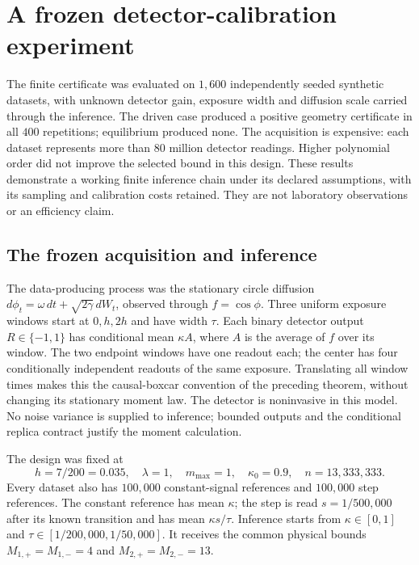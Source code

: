 \chapter{A frozen detector-calibration experiment}
\label{ch:dc-experiment}

The finite certificate was evaluated on $1{,}600$ independently seeded
synthetic datasets, with unknown detector gain, exposure width and diffusion
scale carried through the inference.  The driven case produced a positive
geometry certificate in all $400$ repetitions; equilibrium produced none.
The acquisition is expensive: each dataset represents more than $80$ million
detector readings.  Higher polynomial order did not improve the selected
bound in this design.  These results demonstrate a working finite inference
chain under its declared assumptions, with its sampling and calibration
costs retained.  They are not laboratory observations or an efficiency claim.

\section{The frozen acquisition and inference}

The data-producing process was the stationary circle diffusion
$d\phi_t=\omega\,dt+\sqrt{2\gamma}\,dW_t$, observed through
$f=\cos\phi$.  Three uniform exposure windows start at $0,h,2h$ and have
width $\tau$.  Each binary detector output $R\in\{-1,1\}$ has conditional
mean $\kappa A$, where $A$ is the average of $f$ over its window.  The two
endpoint windows have one readout each; the center has four conditionally
independent readouts of the same exposure.  Translating all window times
makes this the causal-boxcar convention of the preceding theorem, without
changing its stationary moment law.
The detector is noninvasive in this model.  No noise variance is supplied
to inference; bounded outputs and the conditional replica contract justify
the moment calculation.

The design was fixed at
\[
 h=7/200=0.035,\quad \lambda=1,\quad m_{\max}=1,
 \quad\kappa_0=0.9,\quad n=13{,}333{,}333.
\]
Every dataset also has $100{,}000$ constant-signal references and $100{,}000$
step references.  The constant reference has mean $\kappa$; the step is read
$s=1/500{,}000$ after its known transition and has mean $\kappa s/\tau$.
Inference starts from $\kappa\in[0,1]$ and
$\tau\in[1/200{,}000,1/50{,}000]$.  It receives the common physical bounds
$M_{1,+}=M_{1,-}=4$ and $M_{2,+}=M_{2,-}=13$.

